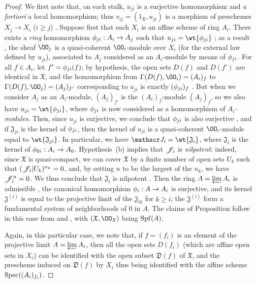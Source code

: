 \begin{proof}
\label{proof-1.10.6.3}
We first note that, on each stalk, $u_{ji}$ is a surjective homomorphism and \emph{a fortiori} a local homomorphism; thus $v_{ij}=(1_\mathfrak{X},u_{ji})$ is a morphism of preschemes $X_j\to X_i$ ($i\geq j$) .
Suppose first that each $X_i$ is an affine scheme of ring $A_i$.
There exists a \emph{ring} homomorphism $\vphi_{ji}:A_i\to A_j$ such that $u_{ji}=\wt{\vphi_{ji}}$ ; as a result , the sheaf $\OO_j$ is a quasi-coherent $\OO_i$-module over $X_i$ (for the external law defined by $u_{ji}$), associated to $A_j$ considered as an $A_i$-module by means of $\phi_{ji}$.
For all $f\in A_i$, let $f'=\phi_{ji}(f)$; by hypothesis, the open sets $D(f)$ and $D(f')$ are identical in $\mathfrak{X}$, and the homomorphism from $\Gamma(D(f),\OO_i)=(A_i)_f$ to $\Gamma(D(f),\OO_j)=(A_j)_{f'}$ corresponding to $u_{ji}$ is exactly $(\phi_{ji})_f$ .
But when we consider $A_j$ as an $A_i$-module, $(A_j)_{f'}$ is the $(A_i)_f$-module $(A_j)_f$, so we also have $u_{ji}=\wt{\vphi_{ji}}$, where $\phi_{ji}$ is now considered as a homomorphism of \emph{$A_i$-modules}.
Then, since $u_{ji}$ is surjective, we conclude that $\phi_{ji}$ is also surjective , and if $\mathfrak{J}_{ji}$ is the kernel of $\phi_{ji}$, then the kernel of $u_{ji}$ is a quasi-coherent $\OO_i$-module equal to $\wt{\mathfrak{J}_{ji}}$.
In particular, we have $\sh{J}_i=\wt{\mathfrak{J}_i}$, where $\mathfrak{J}_i$ is the kernel of $\vphi_{0i}:A_i\to A_0$.
Hypothesis~(b) implies that $\mathscr{J}_i$ is \emph{nilpotent}: indeed, since $\mathfrak{X}$ is quasi-compact, we can cover $\mathfrak{X}$ by a finite number of open sets $U_k$ such that $(\mathscr{J}_i|U_k)^{n_k}=0$, and, by setting $n$ to be the largest of the $n_k$, we have $\mathscr{J}_i^n=0$.
We thus conclude that $\mathfrak{J}_i$ is nilpotent .
Then the ring $A=\varprojlim A_i$ is admissible , the canonical homomorphism $\vphi_i:A\to A_i$ is surjective, and its kernel $\mathfrak{J}^{(i)}$ is equal to the projective limit of the $\mathfrak{J}_{ik}$ for $k\geq i$; the $\mathfrak{J}^{(i)}$ form a fundamental system of neighborhoods of $0$ in $A$.
The claims of Proposition  follow in this case from  and , with $(\mathfrak{X},\OO_\mathfrak{X})$ being $\operatorname{Spf}(A)$.

Again, in this particular case, we note that, if $f=(f_i)$ is an element of the projective limit $A=\varprojlim A_i$, then all the open sets $D(f_i)$ (which are affine open sets in $X_i$) can be identified with the open subset $\mathfrak{D}(f)$ of $\mathfrak{X}$, and the prescheme induced on $\mathfrak{D}(f)$ by $X_i$ thus being identified with the affine scheme $\operatorname{Spec}((A_i)_{f_i})$.


\end{proof}
